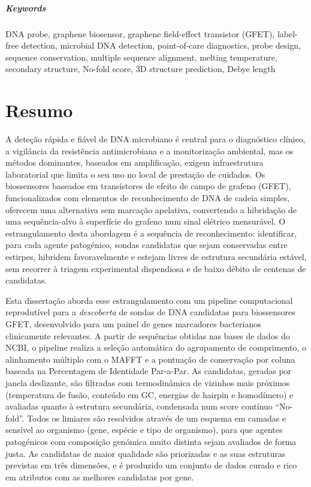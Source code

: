 \paragraph{Keywords} DNA probe, graphene biosensor, graphene field-effect transistor
(GFET), label-free detection, microbial DNA detection, point-of-care diagnostics, probe design,
sequence conservation, multiple sequence alignment, melting temperature, secondary structure,
No-fold score, 3D structure prediction, Debye length

\cleardoublepage

\chapter*{Resumo}

A deteção rápida e fiável de DNA microbiano é central para o diagnóstico clínico, a vigilância da
resistência antimicrobiana e a monitorização ambiental, mas os métodos dominantes, baseados em
amplificação, exigem infraestrutura laboratorial que limita o seu uso no local de prestação de cuidados.
Os biossensores baseados em transístores de efeito de campo de grafeno (GFET), funcionalizados com
elementos de reconhecimento de DNA de cadeia simples, oferecem uma alternativa sem marcação
apelativa, convertendo a hibridação de uma sequência-alvo à superfície do grafeno num sinal elétrico
mensurável. O estrangulamento desta abordagem é a sequência de reconhecimento: identificar, para cada
agente patogénico, sondas candidatas que sejam conservadas entre estirpes, hibridem favoravelmente e
estejam livres de estrutura secundária estável, sem recorrer à triagem experimental dispendiosa e de
baixo débito de centenas de candidatas.

Esta dissertação aborda esse estrangulamento com um pipeline computacional reprodutível para a
\emph{descoberta} de sondas de DNA candidatas para biossensores GFET, desenvolvido para um painel de
genes marcadores bacterianos clinicamente relevantes. A partir de sequências obtidas nas bases de dados
do NCBI, o pipeline realiza a seleção automática do agrupamento de comprimento, o alinhamento múltiplo
com o MAFFT e a pontuação de conservação por coluna baseada na Percentagem de Identidade
Par-a-Par. As candidatas, geradas por janela deslizante, são filtradas com termodinâmica de vizinhos
mais próximos (temperatura de fusão, conteúdo em GC, energias de hairpin e homodímero) e avaliadas
quanto à estrutura secundária, condensada num score contínuo ``No-fold''. Todos os limiares são
resolvidos através de um esquema em camadas e sensível ao organismo (gene, espécie e tipo de
organismo), para que agentes patogénicos com composição genómica muito distinta sejam avaliados de
forma justa. As candidatas de maior qualidade são priorizadas e as suas estruturas previstas em três
dimensões, e é produzido um conjunto de dados curado e rico em atributos com as melhores candidatas
por gene.

